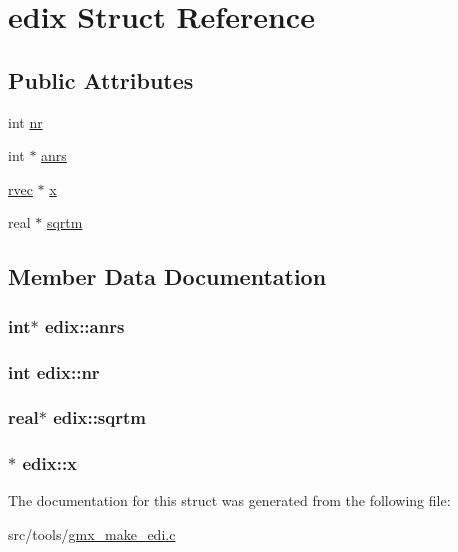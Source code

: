 \hypertarget{structedix}{\section{edix \-Struct \-Reference}
\label{structedix}
}
\subsection*{\-Public \-Attributes}
\begin{DoxyCompactItemize}
\item 
int \hyperlink{structedix_a3e83d2989ca06863ee75e1dc8709635f}{nr}
\item 
int $\ast$ \hyperlink{structedix_aa238bb557ac56046d430aa720466d04d}{anrs}
\item 
\hyperlink{share_2template_2gromacs_2types_2simple_8h_aa02a552a4abd2f180c282a083dc3a999}{rvec} $\ast$ \hyperlink{structedix_a21068717637a189828dbc5a46e447475}{x}
\item 
real $\ast$ \hyperlink{structedix_a80c16fcb1dfb96bbc3c85ed863a1deda}{sqrtm}
\end{DoxyCompactItemize}


\subsection{\-Member \-Data \-Documentation}
\hypertarget{structedix_aa238bb557ac56046d430aa720466d04d}{
\subsubsection[{anrs}]{\setlength{\rightskip}{0pt plus 5cm}int$\ast$ {\bf edix\-::anrs}}}\label{structedix_aa238bb557ac56046d430aa720466d04d}
\hypertarget{structedix_a3e83d2989ca06863ee75e1dc8709635f}{
\subsubsection[{nr}]{\setlength{\rightskip}{0pt plus 5cm}int {\bf edix\-::nr}}}\label{structedix_a3e83d2989ca06863ee75e1dc8709635f}
\hypertarget{structedix_a80c16fcb1dfb96bbc3c85ed863a1deda}{
\subsubsection[{sqrtm}]{\setlength{\rightskip}{0pt plus 5cm}real$\ast$ {\bf edix\-::sqrtm}}}\label{structedix_a80c16fcb1dfb96bbc3c85ed863a1deda}
\hypertarget{structedix_a21068717637a189828dbc5a46e447475}{
\subsubsection[{x}]{$\ast$ {\bf edix\-::x}}}\label{structedix_a21068717637a189828dbc5a46e447475}


\-The documentation for this struct was generated from the following file\-:\begin{DoxyCompactItemize}
\item 
src/tools/\hyperlink{gmx__make__edi_8c}{gmx\-\_\-make\-\_\-edi.\-c}\end{DoxyCompactItemize}
